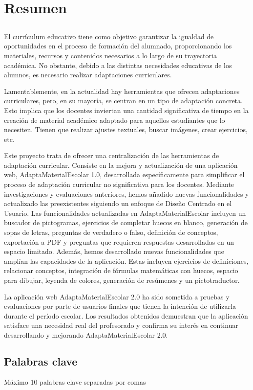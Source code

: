 \chapter*{Resumen}

\section*{\tituloPortadaVal}

El currículum educativo tiene como objetivo garantizar la igualdad de oportunidades en el proceso de formación del alumnado, proporcionando los materiales, recursos y contenidos necesarios a lo largo de su trayectoria académica. No obstante, debido a las distintas necesidades educativas de los alumnos, es necesario realizar adaptaciones curriculares.

Lamentablemente, en la actualidad hay herramientas que ofrecen adaptaciones curriculares, pero, en su mayoría, se centran en un tipo de adaptación concreta. Esto implica que los docentes inviertan una cantidad significativa de tiempo en la creación de material académico adaptado para aquellos estudiantes que lo necesiten. Tienen que realizar ajustes textuales, buscar imágenes, crear ejercicios, etc.

Este proyecto trata de ofrecer una centralización de las herramientas de adaptación curricular. Consiste en la mejora y actualización de una aplicación web, AdaptaMaterialEscolar 1.0, desarrollada específicamente para simplificar el proceso de adaptación curricular no significativa para los docentes. Mediante investigaciones y evaluaciones anteriores, hemos añadido nuevas funcionalidades y actualizado las preexistentes siguiendo un enfoque de Diseño Centrado en el Usuario. Las funcionalidades actualizadas en AdaptaMaterialEscolar incluyen un buscador de pictogramas, ejercicios de completar huecos en blanco, generación de sopas de letras, preguntas de verdadero o falso, definición de conceptos, exportación a PDF y preguntas que requieren respuestas desarrolladas en un espacio limitado. Además, hemos desarrollado nuevas funcionalidades que amplían las capacidades de la aplicación. Estas incluyen ejercicios de definiciones, relacionar conceptos, integración de fórmulas matemáticas con huecos, espacio para dibujar, leyenda de colores, generación de resúmenes y un pictotraductor.

La aplicación web AdaptaMaterialEscolar 2.0 ha sido sometida a pruebas y evaluaciones por parte de usuarios finales que tienen la intención de utilizarla durante el período escolar. Los resultados obtenidos demuestran que la aplicación satisface una necesidad real del profesorado y confirma su interés en continuar desarrollando y mejorando AdaptaMaterialEscolar 2.0.


\section*{Palabras clave}
   
\noindent Máximo 10 palabras clave separadas por comas

   


